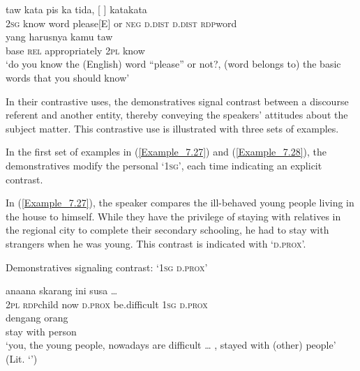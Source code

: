 {\ea
\label{Example_7.26}
 {{taw}} {{kata}} {{pis}} {ka} {{tida,}} {[} {]} {kata{\Tilde}kata}\\ %
 \textsc{2sg}  {know}  {word}  {please[E]}  or  {\textsc{neg}}  \textsc{d.dist}  \textsc{d.dist}  \textsc{rdp}{\Tilde}word\\
  {yang}  {harusnya}  {kamu}  {taw}\\
 {base}  {\textsc{rel}}  {appropriately}  {\textsc{2pl}}  {know}\\
 ‘do you know the (English) word ``please'' or not?,  (word belongs to) the basic words that you should know’ \textstyleExampleSource{[081115-001a-Cv.0145]}
\z



In their contrast\-ive uses, the demonstratives signal contrast between a discourse referent and another entity, thereby conveying the speakers’ attitudes about the subject matter. This contrastive use is illustrated with three sets of examples.



In the first set of examples in (\ref{Example_7.27}) and (\ref{Example_7.28}), the demonstratives modify the personal   ‘\textsc{1sg}’, each time indicating an explicit contrast.



In (\ref{Example_7.27}), the speaker compares the ill-behaved young people living in the house to himself. While they have the privilege of staying with relatives in the regional city to complete their secondary schooling, he had to stay with strangers when he was young. This contrast is indicated with  ‘\textsc{d.prox}’.


\begin{styleExampleTitle}
Demonstratives signaling contrast:  ‘\textsc{1sg} \textsc{d.prox}’
\end{styleExampleTitle}

\ea
\label{Example_7.27}
 {{ana{\Tilde}ana}} {skarang} {ini} {susa} {\ldots} {} {}\\ %
 \textsc{2pl}  {\textsc{rdp}{\Tilde}child}  now  \textsc{d.prox}  be.difficult   { }  \textsc{1sg}  \textsc{d.prox}\\
  dengang  {orang}\\
 {stay}  with  {person}\\
\glt 
‘you, the young people, nowadays are difficult {\ldots} , stayed with (other) people’ (Lit. ‘’) \textstyleExampleSource{[081115-001b-Cv.0038/0040]}
\z



}
